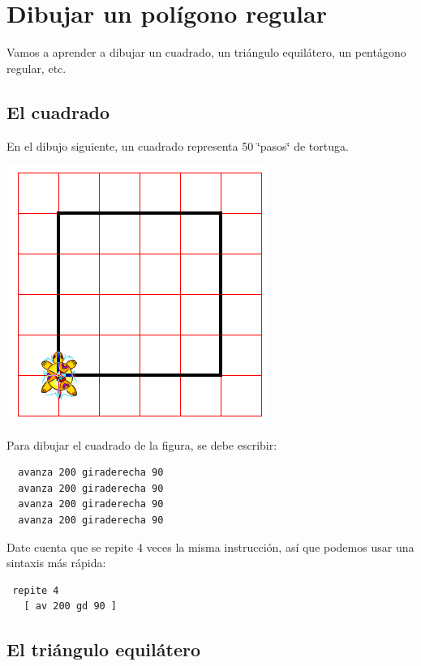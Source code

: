 \documentclass[12pt,twoside,spanish,a4paper]{report}
\begin{document}
\section{Dibujar un pol\'igono regular}
   \label{sub:Dibujar-poligono}

\noindent Vamos a aprender a dibujar un cuadrado, un tri\'angulo equil\'atero,
un pent\'agono regular, etc.

\subsection{El cuadrado}
   \label{sub:El-cuadrado}

En el dibujo siguiente, un cuadrado representa 50 \char`\"{}pasos\char`\"{}
de tortuga.
\begin{center}
   \includegraphics[scale=0.4]{Imagenes_Tutorial/01_Cuadrado.png}
\end{center}

\noindent Para dibujar el cuadrado de la figura, se debe escribir:
\begin{verbatim}
  avanza 200 giraderecha 90
  avanza 200 giraderecha 90
  avanza 200 giraderecha 90
  avanza 200 giraderecha 90 \end{verbatim}
Date cuenta que se repite 4 veces la misma instrucci\'on, as\'i que podemos
usar una sintaxis m\'as r\'apida:
\begin{verbatim}
 repite 4 
   [ av 200 gd 90 ] \end{verbatim}

\subsection{El tri\'angulo equil\'atero}
   \label{sub:El-triangulo}
\end{document}
